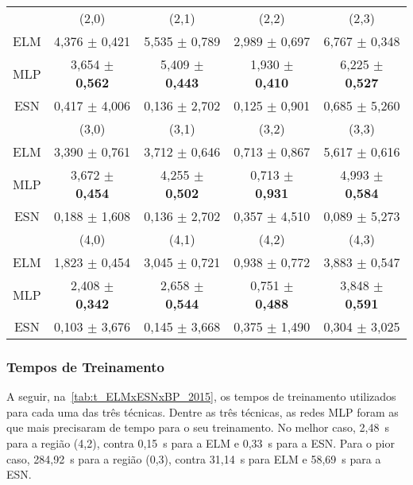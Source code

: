 \begin{table}[H]
\begin{footnotesize}
\begin{tabular}{c*{4}c}
			    &          (2,0)    &        (2,1)      &        (2,2)       &       (2,3)      \\\cmidrule(lr){2-2}\cmidrule(lr){3-3}\cmidrule(lr){4-4}\cmidrule(lr){5-5}                                 
			ELM & 4,376 $\pm$ 0,421 & 5,535 $\pm$ 0,789 & 2,989 $\pm$ 0,697 & 6,767 $\pm$ 0,348 \\
			MLP & 3,654 $\pm$ \textbf{0,562} & 5,409 $\pm$ \textbf{0,443} & 1,930 $\pm$ \textbf{0,410} & 6,225 $\pm$ \textbf{0,527} \\
			ESN & 0,417 $\pm$ 4,006 & 0,136 $\pm$ 2,702 & 0,125 $\pm$ 0,901 & 0,685 $\pm$ 5,260 \\\midrule \midrule
			    &        (3,0)      &        (3,1)      &        (3,2)      &       (3,3)       \\\cmidrule(lr){2-2}\cmidrule(lr){3-3}\cmidrule(lr){4-4}\cmidrule(lr){5-5}                                 
			ELM & 3,390 $\pm$ 0,761 & 3,712 $\pm$ 0,646 & 0,713 $\pm$ 0,867 & 5,617 $\pm$ 0,616 \\
			MLP & 3,672 $\pm$ \textbf{0,454} & 4,255 $\pm$ \textbf{0,502} & 0,713 $\pm$ \textbf{0,931} & 4,993 $\pm$ \textbf{0,584} \\
			ESN & 0,188 $\pm$ 1,608 & 0,136 $\pm$ 2,702 & 0,357 $\pm$ 4,510 & 0,089 $\pm$ 5,273 \\\midrule \midrule
			    &        (4,0)      &        (4,1)      &        (4,2)      &       (4,3)       \\\cmidrule(lr){2-2}\cmidrule(lr){3-3}\cmidrule(lr){4-4}\cmidrule(lr){5-5}                               
			ELM & \cellcolor{red!15}1,823 $\pm$ 0,454 & 3,045 $\pm$ 0,721 & 0,938 $\pm$ 0,772 & 3,883 $\pm$ 0,547 \\
			MLP & 2,408 $\pm$ \textbf{0,342} & 2,658 $\pm$ \textbf{0,544} & 0,751 $\pm$ \textbf{0,488} & 3,848 $\pm$ \textbf{0,591} \\
			ESN & 0,103 $\pm$ 3,676 & 0,145 $\pm$ 3,668 & 0,375 $\pm$ 1,490 & 0,304 $\pm$ 3,025 \\\bottomrule
		\end{tabular}%
	\end{footnotesize}
\end{table}%

\subsubsection{Tempos de Treinamento}

A seguir, na~\autoref{tab:t_ELMxESNxBP_2015}, os tempos de treinamento utilizados para cada uma das três técnicas. Dentre as três técnicas, as redes MLP foram as que mais precisaram de tempo para o seu treinamento. No melhor caso, 2,48~s para a região (4,2), contra 0,15~s para a ELM e 0,33~s para a ESN. Para o pior caso, 284,92~s para a região (0,3), contra 31,14~s para ELM e 58,69~s para a ESN.

